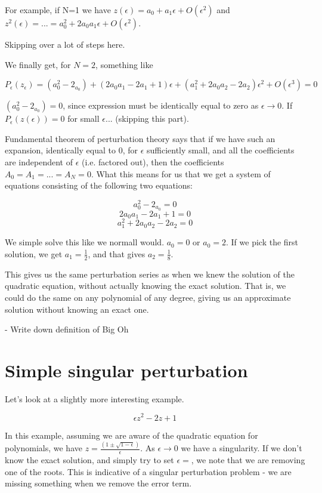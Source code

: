 \documentclass[12pt]{report}
\begin{document}
For example, if N=1 we have $z(\epsilon) = a_0 + a_1\epsilon + O(\epsilon^2)$
and $z^2(\epsilon) = ... = a_0^2 + 2 a_0 a_1 \epsilon + O(\epsilon^2)$.

Skipping over a lot of steps here.

We finally get, for $N=2$, something like

$$P_\epsilon(z_\epsilon) = (a_0^2 - 2_{a_0}) + (2 a_0 a_1 - 2 a_1 +1)\epsilon + (a_1^2 + 2 a_0 a_2 -
2 a_2)\epsilon^2 + O(\epsilon^3) = 0$$

$(a_0^2 - 2_{a_0}) = 0$, since expression must be identically equal to zero as
$\epsilon \to 0$. If $P_\epsilon(z(\epsilon)) = 0$ for small $\epsilon$... (skipping this part).

Fundamental theorem of perturbation theory says that if we have such an
expansion, identically equal to 0, for $\epsilon$ sufficiently small, and all
the coefficients are independent of $\epsilon$ (i.e. factored out), then the
coefficients $A_0 = A_1 = ... = A_N = 0$. What this means for us that we get a
system of equations consisting of the following two equations:

$$ a_0^2 - 2_{a_0} = 0$$
$$ 2 a_0 a_1 - 2 a_1 +1 = 0 $$
$$ a_1^2 + 2 a_0 a_2 -2 a_2 = 0$$

We simple solve this like we normall would. $a_0 = 0$ or $a_0 = 2$. If we pick
the first solution, we get $a_1=\frac 1 2$, and that gives $a_2 = \frac 1 8$.

This gives us the same perturbation series as when we knew the solution of the
quadratic equation, without actually knowing the exact solution. That is, we
could do the same on any polynomial of any degree, giving us an approximate
solution without knowing an exact one.


- Write down definition of Big Oh

\section{Simple singular perturbation}

Let's look at a slightly more interesting example.

\begin{equation}
  \epsilon z^2 - 2z + 1
\end{equation}

In this example, assuming we are aware of the quadratic equation for
polynomials, we have $z = \frac{(1 \pm \sqrt{1-\epsilon})}{\epsilon}$. As
$\epsilon \to 0$ we have a singularity. If we don't know the exact solution, and
simply try to set $\epsilon=$, we note that we are removing one of the roots. This is indicative of a singular perturbation problem - we are missing something when we remove the error term.
\end{document}
